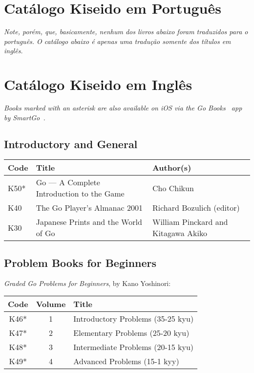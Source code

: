 \chapter{Catálogo Kiseido em Português}\label{ap:pt}

\emph{Note, porém, que, basicamente, nenhum dos livros abaixo foram traduzidos para o português. O catálogo abaixo é apenas uma tradução somente dos títulos em inglês.}

\bigskip

\chapter{Catálogo Kiseido em Inglês}\label{ap:en}

\emph{Books marked with an asterisk are also available on iOS via the Go Books~\cite{gobooks} app by SmartGo~\cite{smartgo}.}

\section{Introductory and General}

\begin{longtable}{l|p{50mm}|p{50mm}} 
    \hline
    \textbf{Code} & \textbf{Title} & \textbf{Author(s)} \\
    \hline \hline
    K50* & Go --- A Complete Introduction to the Game & Cho Chikun \\
    \hline
    K40 & The Go Player's Almanac 2001 & Richard Bozulich (editor) \\
    \hline
    K30 & Japanese Prints and the World of Go & William Pinckard and Kitagawa Akiko \\
    \hline
\end{longtable}


\section{Problem Books for Beginners}

\emph{Graded Go Problems for Beginners}, by Kano Yoshinori:

\begin{longtable}{c|c|l} 
    \hline
    \textbf{Code} & \textbf{Volume} & \textbf{Title} \\
    \hline \hline
    K46* & 1 & Introductory Problems (35-25 kyu) \\
    \hline
    K47* & 2 & Elementary Problems (25-20 kyu) \\
    \hline
    K48* & 3 & Intermediate Problems (20-15 kyu) \\
    \hline
    K49* & 4 & Advanced Problems (15-1 kyy) \\
    \hline
\end{longtable}


